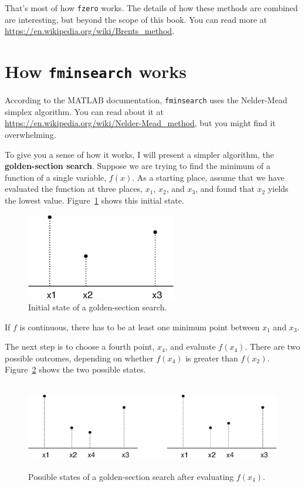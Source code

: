 \documentclass[
]{book}
\numberwithin{Answer}{chapter}
\numberwithin{Exercise}{chapter}
\begin{document}
That's most of how {\tt fzero} works.  The details of how these methods are combined are interesting, but beyond the scope of this book.  You can read more at \url{https://en.wikipedia.org/wiki/Brents_method}.  


\section{How {\tt fminsearch} works}
\label{sect:howfminsearch}

According to the MATLAB documentation, {\tt fminsearch} uses the Nelder-Mead simplex algorithm.  You can read about it at \url{https://en.wikipedia.org/wiki/Nelder-Mead_method}, but you might find it overwhelming.

To give you a sense of how it works, I will present a simpler algorithm, the {\bf golden-section search}.  Suppose we are trying to find the minimum of a function of a single variable, $f(x)$.  As a starting place, assume that we have evaluated the function at three places, 
$x_1$, $x_2$, and $x_3$, and found that $x_2$ yields the lowest
value. Figure~\ref{fig:golden1} shows this initial state.

\begin{figure}
\centerline{\includegraphics[height=1.5in]{figs/golden1.eps}}
\caption{Initial state of a golden-section search.}
\label{fig:golden1}
\end{figure}

If $f$ is continuous, there has to be at least one
minimum point between $x_1$ and $x_3$.

The next step is to choose a fourth point, $x_4$, and evaluate
$f(x_4)$.  There are two possible outcomes, depending on whether
$f(x_4)$ is greater than $f(x_2)$.
Figure~\ref{fig:golden2} shows the two possible states.

\begin{figure}
\centerline{\includegraphics[height=1.5in]{figs/golden2.eps}}
\caption{Possible states of a golden-section search after evaluating $f(x_4)$.}
\label{fig:golden2}
\end{figure}
\end{document}
